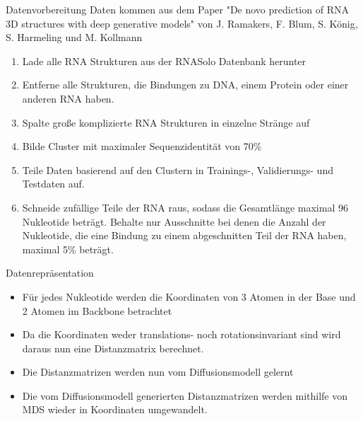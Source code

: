 \begin{frame}{Datenvorbereitung}
Daten kommen aus dem Paper "De novo prediction of RNA 3D structures with deep generative models" von J. Ramakers,  F. Blum, S. König, S. Harmeling und M. Kollmann
\begin{enumerate}
\item Lade alle RNA Strukturen aus der RNASolo Datenbank herunter
\item Entferne alle Strukturen, die Bindungen zu DNA, einem Protein oder einer anderen RNA haben.
\item Spalte große komplizierte RNA Strukturen in einzelne Stränge auf
\item Bilde Cluster  mit maximaler Sequenzidentität von 70\%
\item Teile Daten basierend auf den Clustern in Trainings-, Validierungs- und Testdaten auf.
\item Schneide zufällige Teile der RNA raus, sodass die Gesamtlänge maximal 96 Nukleotide beträgt. Behalte nur Ausschnitte bei denen die Anzahl der Nukleotide, die eine Bindung zu einem abgeschnitten Teil der RNA haben, maximal 5\% beträgt.
\end{enumerate}
\end{frame}

\begin{frame}{Datenrepräsentation}
\begin{itemize}
\item Für jedes Nukleotide werden die Koordinaten von 3 Atomen in der Base und 2 Atomen im Backbone betrachtet
\item Da die Koordinaten weder translations- noch rotationsinvariant sind wird daraus nun eine Distanzmatrix berechnet.
\item Die Distanzmatrizen werden nun vom Diffusionsmodell gelernt
\item Die vom Diffusionsmodell generierten Distanzmatrizen werden mithilfe von MDS wieder in Koordinaten umgewandelt.
\end{itemize}
\end{frame}
